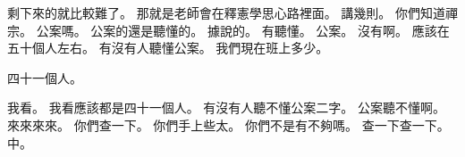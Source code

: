 \hypertarget{c01:cue:179}{}剩下來的就比較難了。
\hypertarget{c01:cue:180}{}那就是老師會在釋憲學思心路裡面。
\hypertarget{c01:cue:181}{}講幾則。
\hypertarget{c01:cue:182}{}你們知道禪宗。
\hypertarget{c01:cue:183}{}公案嗎。
\hypertarget{c01:cue:184}{}公案的還是聽懂的。
\hypertarget{c01:cue:185}{}據說的。
\hypertarget{c01:cue:186}{}有聽懂。
\hypertarget{c01:cue:187}{}公案。
\hypertarget{c01:cue:188}{}沒有啊。
\hypertarget{c01:cue:189}{}應該在五十個人左右。
\hypertarget{c01:cue:190}{}有沒有人聽懂公案。
\hypertarget{c01:cue:191}{}我們現在班上多少。

\hypertarget{c01:cue:192}{}四十一個人。

\hypertarget{c01:cue:193}{}我看。
\hypertarget{c01:cue:194}{}我看應該都是四十一個人。
\hypertarget{c01:cue:195}{}有沒有人聽不懂公案二字。
\hypertarget{c01:cue:196}{}公案聽不懂啊。
\hypertarget{c01:cue:197}{}來來來來。
\hypertarget{c01:cue:198}{}你們查一下。
\hypertarget{c01:cue:199}{}你們手上些太。
\hypertarget{c01:cue:200}{}你們不是有不夠嗎。
\hypertarget{c01:cue:201}{}查一下查一下。
\hypertarget{c01:cue:202}{}中。

